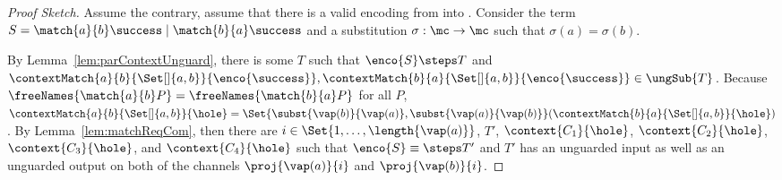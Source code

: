 \documentclass[final,copyright,creativecommons]{eptcs}
\begin{document}
\begin{proof}[Proof Sketch]
	Assume the contrary, \ie assume that there is a valid encoding \encod from \piT into \piNM.
	Consider the term $ S = \match{a}{b}\success \mid \match{b}{a}\success $ and a substitution $ \sigma : \mc \to \mc $ such that $ \sigma(a) = \sigma(b) $.
	
	By Lemma~\ref{lem:parContextUnguard}, there is some $ T $ such that $ \enco{S} \steps T $ and $ \contextMatch{a}{b}{\Set[]{ a, b }}{\enco{\success}}, \contextMatch{b}{a}{\Set[]{ a, b }}{\enco{\success}} \in \ungSub{T} $.
	Because $ \freeNames{\match{a}{b}P} = \freeNames{\match{b}{a}P} $ for all $ P $, $ \contextMatch{a}{b}{\Set[]{ a, b }}{\hole} = \Set{ \subst{\vap(b)}{\vap(a)}, \subst{\vap(a)}{\vap(b)} }\!\left( \contextMatch{b}{a}{\Set[]{ a, b }}{\hole} \right) $.
	By Lemma~\ref{lem:matchReqCom}, then there are $ i \in \Set{ 1, \ldots, \length{\vap(a)}} $, $ T' $, $ \context{C_1}{\hole} $, $ \context{C_2}{\hole} $, $ \context{C_3}{\hole} $, and $ \context{C_4}{\hole} $ such that $ \enco{S} \equiv\steps T' $ and $ T' $ has an unguarded input as well as an unguarded output on both of the channels $ \proj{\vap\!\left( a \right)}{i} $ and $ \proj{\vap\!\left( b \right)}{i} $.
	

\end{proof}
\end{document}
